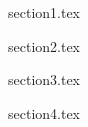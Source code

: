 \documentclass{TMR}
\begin{document}
\begin{resume}

{section1.tex}

{section2.tex}

{section3.tex}

{section4.tex}


\end{resume}
\end{document}
